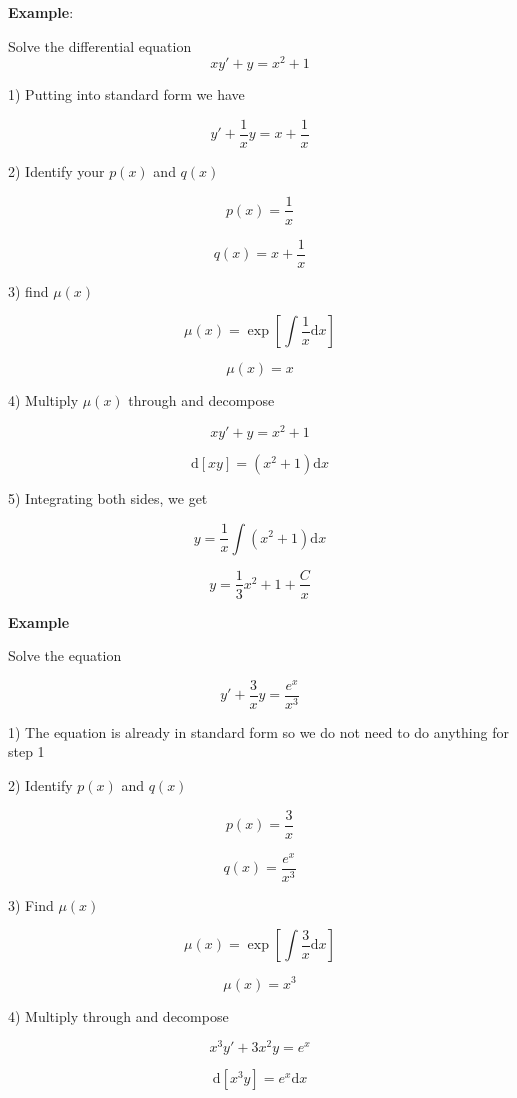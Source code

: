 \documentclass{article}
\begin{document}
\textbf{Example}:

Solve the differential equation 
$$ xy' + y = x^2 + 1$$

1) Putting into standard form we have 

$$y' + \frac{1}{x}y = x + \frac{1}{x} $$

2) Identify your $p\left(x\right)$ and $q\left(x\right)$

$$ p\left(x\right) = \frac{1}{x} $$

$$ q\left(x\right) = x + \frac{1}{x} $$

3) find $\mu \left(x \right)$

$$ \mu\left(x\right) = \exp\left[ \int \frac{1}{x} \mathrm{d}x \right] $$

$$ \mu \left( x \right) = x $$

4) Multiply $\mu \left( x \right)$ through and decompose

$$ x y' + y = x^2 + 1 $$

$$ \mathrm{d}\left[ x y \right] = \left( x^2 + 1 \right) \mathrm{d}x $$

5) Integrating both sides, we get 

$$ y = \frac{1}{x} \int \left( x^2 + 1 \right) \mathrm{d}x $$

\begin{equation}
\boxed{y = \frac{1}{3} x^2 + 1 + \frac{C}{x} }
\end{equation}

\newpage

\textbf{Example}

Solve the equation

$$ y' + \frac{3}{x} y = \frac{e^x}{x^3} $$

1) The equation is already in standard form so we do not need to do anything for step 1

2) Identify $p \left( x \right)$ and $q \left( x \right)$

$$ p \left( x \right) = \frac{3}{x}$$

$$ q\left( x \right) = \frac{e^x}{x^3} $$ 


3) Find $\mu \left( x \right)$

$$ \mu \left( x \right) = \exp\left[ \int \frac{3}{x} \mathrm{d}x \right]$$

$$ \mu \left( x \right) = x^3 $$ 

4) Multiply through and decompose

$$ x^3 y' + 3x^2y = e^x $$

$$ \mathrm{d}\left[ x^3 y \right] = e^x \mathrm{d}x $$
\end{document}
